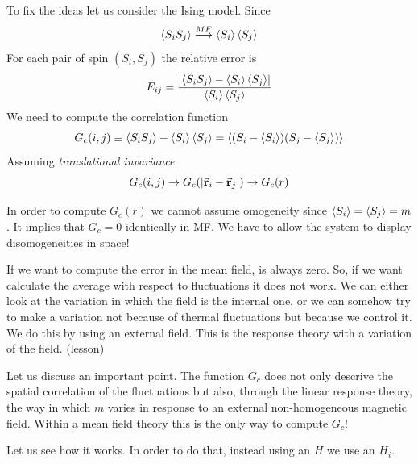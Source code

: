 \documentclass[../main/main.tex]{subfiles}
\begin{document}
To fix the ideas let us consider the Ising model. Since
\begin{equation}
  \expval{S_i S_j} \overset{MF}{\longrightarrow } \expval{S_i} \expval{S_j}
\end{equation}
For each pair of spin \( (S_i,S_j) \) the relative error is
\begin{equation}
  E_{ij} = \frac{ \abs{\expval{S_i S_j}  - \expval{S_i} \expval{S_j}}   }{\expval{S_i}\expval{S_j}  }
\end{equation}
We need to compute the correlation function
\begin{equation}
  G_c (i,j) \equiv \expval{S_i S_j} - \expval{S_i} \expval{S_j} = \expval{(S_i -\expval{S_i} )(S_j - \expval{S_j} )}
\end{equation}
Assuming \emph{translational invariance}
\begin{equation}
  G_c (i,j) \rightarrow G_c \qty(\abs{\va{r}_i - \va{r}_j} ) \rightarrow G_c (r)
\end{equation}
\begin{remark}
In order to compute \( G_c (r) \) we cannot assume omogeneity since \( \expval{S_i} = \expval{S_j} = m   \). It implies that \( G_c = 0 \) identically in MF. We have to allow the system to display disomogeneities in space!
\end{remark}

\begin{remark}
If we want to compute the error in the mean field, is always zero. So, if we want calculate the average with respect to fluctuations it does not work. We can either look at the variation in which the field is the internal one, or we can somehow try to make a variation not because of thermal fluctuations but because we control it. We do this by using an external field. This is the response theory with a variation of the field. (lesson)
\end{remark}

Let us discuss an important point. The function \( G_c \) does not only descrive the spatial correlation of the fluctuations but also, through the linear response theory, the way in which \( m \) varies in response to an external non-homogeneous magnetic field. Within a mean field theory this is the  only way to compute \( G_c \)!

Let us see how it works. In order to do that, instead using an \( H \) we use an \( H_i \).
\end{document}
